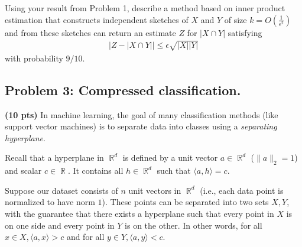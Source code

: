 \documentclass[10pt]{article}
\DeclareMathOperator{\R}{\mathbb{R}}
\begin{document}
Using your result from Problem 1, describe a method based on inner product estimation that constructs independent sketches of $X$ and $Y$ of size  $k = O\left(\frac{1}{\epsilon^2}\right)$ and from these sketches can return an estimate $Z$ for $|X\cap Y|$ satisfying
\begin{align*}
	\left|Z - |X\cap Y|\right| \leq \epsilon \sqrt{|X||Y|}
\end{align*}
with probability $9/10$.

%
%


\subsection{Problem 3: Compressed classification.}
\textbf{(10 pts)} In machine learning, the goal of many classification methods (like support vector machines) is to separate data into classes using a \emph{separating hyperplane}.

Recall that a hyperplane in $\R^d$ is defined by a unit vector $a \in \R^d$ ($\|a\|_2 = 1$) and scalar $c \in \R$. It contains all  $h \in \R^d$ such that $\langle a, h\rangle = c$. 

Suppose our dataset consists of $n$ unit vectors in $\R^d$ (i.e., each data point is normalized to have norm $1$). These points can be separated into two sets $X, Y$,
with the guarantee that there exists a hyperplane such that every point in $X$ is on one side and every point in 
$Y$ is on the other. In other words, for all $x\in X, \langle a, x\rangle > c$ and for all $y\in Y, \langle a, y\rangle < c$.
\end{document}
